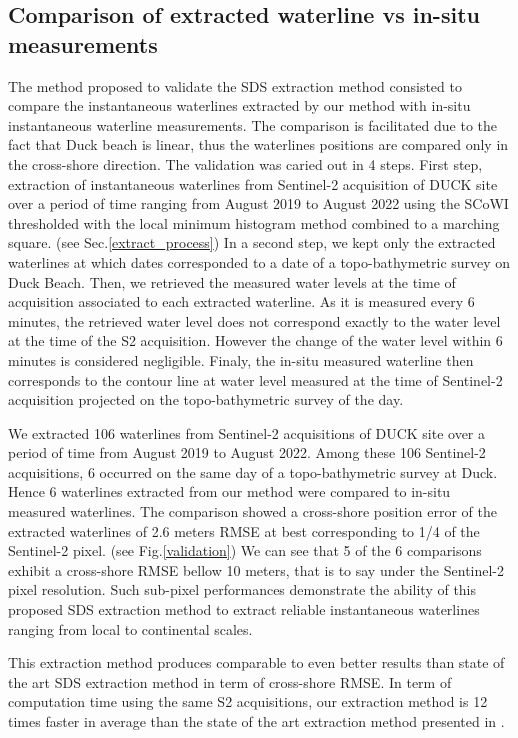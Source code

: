 \documentclass[remotesensing,article,submit,pdftex,moreauthors]{Definitions/mdpi}
\begin{document}
\subsection{Comparison of extracted waterline vs in-situ measurements}
The method proposed to validate the SDS extraction method consisted to compare the instantaneous waterlines extracted by our method with in-situ instantaneous waterline measurements.    
The comparison is facilitated due to the fact that Duck beach is linear, thus the waterlines positions are compared only in the cross-shore direction.
The validation was caried out in 4 steps.
First step, extraction of instantaneous waterlines from Sentinel-2 acquisition of DUCK site over a period of time ranging from August 2019 to August 2022 using the SCoWI thresholded with the local minimum histogram method combined to a marching square. (see Sec.\ref{extract_process})
In a second step, we kept only the extracted waterlines at which dates corresponded to a date of a topo-bathymetric survey on Duck Beach.
Then, we retrieved the measured water levels at the time of acquisition associated to each extracted waterline.
As it is measured every 6 minutes, the retrieved water level does not correspond exactly to the water level at the time of the S2 acquisition.
However the change of the water level within 6 minutes is considered negligible.
Finaly, the in-situ measured waterline then corresponds to the contour line at water level measured at the time of Sentinel-2 acquisition projected on the topo-bathymetric survey of the day.\par
We extracted 106 waterlines from Sentinel-2 acquisitions of DUCK site over a period of time from August 2019 to August 2022.
Among these 106 Sentinel-2 acquisitions, 6 occurred on the same day of a topo-bathymetric survey at Duck.
Hence 6 waterlines extracted from our method were compared to in-situ measured waterlines.
The comparison showed a cross-shore position error of the extracted waterlines of 2.6 meters RMSE at best corresponding to 1/4 of the Sentinel-2 pixel. (see Fig.\ref{validation})
We can see that 5 of the 6 comparisons exhibit a cross-shore RMSE bellow 10 meters, that is to say under the Sentinel-2 pixel resolution.
Such sub-pixel performances demonstrate the ability of this proposed SDS extraction method to extract reliable instantaneous waterlines ranging from local to continental scales.

This extraction method produces comparable to even better results than state of the art SDS extraction method \citep{VOS2019_sub} in term of cross-shore RMSE.
In term of computation time using the same S2 acquisitions, our extraction method is 12 times faster in average than the state of the art extraction method presented in \citep{VOS2019_sub}.
\end{document}
